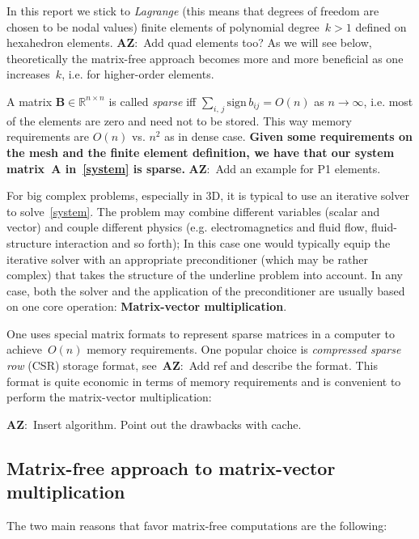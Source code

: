 \documentclass[12pt]{article}
\newcommand{\vect}[1]{\boldsymbol{\mathbf{#1}}}
\newcommand{\AZ}[1]{{\color{red}\textbf{AZ}:~#1}}
\newcommand{\dimSize}{n}
\begin{document}
In this report we stick to \textit{Lagrange} (this means that degrees of freedom are chosen to be nodal values) finite elements of polynomial degree~$k > 1$ defined on hexahedron elements. \AZ{Add quad elements too?} As we will see below, theoretically the matrix-free approach becomes more and more beneficial as one increases~$k$, i.e. for higher-order elements. 

A matrix $\vect B \in \mathbb R^{\dimSize\times\dimSize}$ is called \textit{sparse} iff $\sum_{i,\,j} \mbox{sign}\,b_{ij} = O(\dimSize)$ as $\dimSize \rightarrow \infty$, i.e. most of the elements are zero and need not to be stored. This way memory requirements are $O(\dimSize)$ vs. $\dimSize^2$ as in dense case. \textbf{Given some requirements on the mesh and the finite element definition, we have that our system matrix~$\vect A$ in~\eqref{system} is sparse.} \AZ{Add an example for P1 elements.}

For big complex problems, especially in 3D, it is typical to use an iterative solver to solve~\eqref{system}. The problem may combine different variables (scalar and vector) and couple different physics (e.g. electromagnetics and fluid flow, fluid-structure interaction and so forth); In this case one would typically equip the iterative solver with an appropriate preconditioner (which may be rather complex) that takes the structure of the underline problem into account. In any case, both the solver and the application of the preconditioner are usually based on one core operation: \textbf{Matrix-vector multiplication}.

One uses special matrix formats to represent sparse matrices in a computer to achieve~$O(\dimSize)$ memory requirements. One popular choice is \textit{compressed sparse row} (CSR) storage format, see~\AZ{Add ref and describe the format.} This format is quite economic in terms of memory requirements and is convenient to perform the matrix-vector multiplication:

\AZ{Insert algorithm. Point out the drawbacks with cache.}

\subsection{Matrix-free approach to matrix-vector multiplication}

The two main reasons that favor matrix-free computations are the following:
\end{document}
